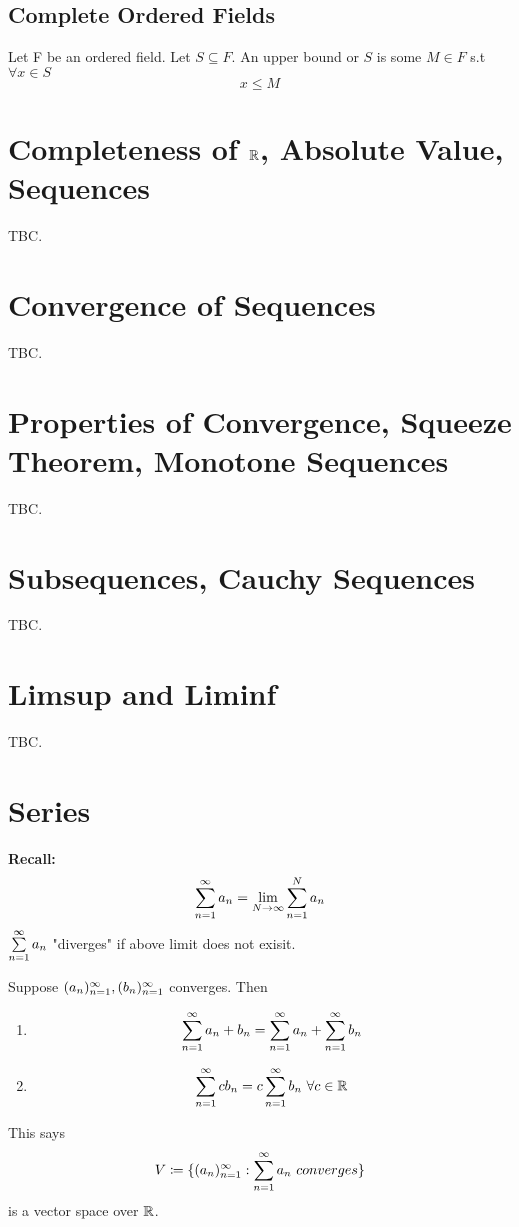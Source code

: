 \documentclass[openany]{report}
\begin{document}
\section{Complete Ordered Fields}
\begin{definition}
    Let F be an ordered field. Let $S \subseteq F$. An upper bound or $S$ is some $M \in F$ s.t $\forall x \in S$
    \[x \leq M\]

\end{definition}



\chapter{Completeness of $\mathbb{R}$, Absolute Value, Sequences }
TBC.
\chapter{Convergence of Sequences}
TBC. 
\chapter{Properties of Convergence, Squeeze Theorem, Monotone Sequences}
TBC. 
\chapter{Subsequences, Cauchy Sequences}
TBC.
\chapter{Limsup and Liminf}
TBC.

\chapter{Series}
\textbf{Recall:}
\[\sum\limits_{n=1}^\infty a_n = \lim_{N\rightarrow \infty} \sum_{n=1}^N a_n\]
$\sum\limits_{n=1}^\infty a_n$ "diverges" if above limit does not exisit.
\begin{prop}
    Suppose $({a}_n)_{n=1}^\infty, ({b}_n)_{n=1}^\infty$ converges. Then
    \begin{enumerate}[label=(\roman*)]
        \item 
        \[\sum_{n=1}^\infty a_n + b_n = \sum\limits_{n=1}^\infty a_n + \sum\limits_{n=1}^\infty b_n\]
        \item
        \[\sum_{n=1}^\infty cb_n = c\sum\limits_{n=1}^\infty b_n \ \forall c \in \mathbb{R}\]
    \end{enumerate}
    This says 
    \[V \coloneqq \{({a}_n)_{n=1}^\infty: \sum\limits_{n=1}^\infty a_n \ converges\}\]
    is a vector space over $\mathbb{R}$.
\end{prop}
\end{document}
